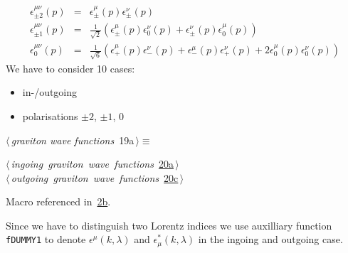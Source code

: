 \documentclass[a4paper,12pt]{amsart}
\renewcommand{\NWtarget}[2]{\hypertarget{#1}{#2}}
\renewcommand{\NWlink}[2]{\hyperlink{#1}{#2}}
\renewcommand{\NWtxtMacroRefIn}{Macro referenced in}
\renewcommand{\NWsep}{${\diamond}$}
\begin{document}
\begin{eqnarray}
\epsilon^{\mu\nu}_{\pm2}(p) &=& \epsilon_\pm^\mu(p)\epsilon_\pm^\nu(p)\\
\epsilon^{\mu\nu}_{\pm1}(p) &=& \frac1{\sqrt2}\left(
	\epsilon_\pm^\mu(p)\epsilon_0^\nu(p)
       +\epsilon_\pm^\nu(p)\epsilon_0^\mu(p)\right)\\
\epsilon^{\mu\nu}_0(p) &=&\frac1{\sqrt6}\left(
        \epsilon_+^\mu(p)\epsilon_-^\nu(p)
       +\epsilon_-^\mu(p)\epsilon_+^\nu(p)
       +2\epsilon_0^\mu(p)\epsilon_0^\nu(p)\right)
\end{eqnarray}
We have to consider 10 cases:
\begin{itemize}
\item in-/outgoing
\item polarisations $\pm2$, $\pm1$, $0$
\end{itemize}

\begin{flushleft} \small
\begin{minipage}{\linewidth}\label{scrap39}\raggedright\small
\NWtarget{nuweb19a}{} $\langle\,${\itshape graviton wave functions}\nobreak\ {\footnotesize {19a}}$\,\rangle\equiv$
\vspace{-1ex}
\begin{list}{}{} \item
\mbox{}\verb@@\hbox{$\langle\,${\itshape ingoing graviton wave functions}\nobreak\ {\footnotesize \NWlink{nuweb20a}{20a}}$\,\rangle$}\verb@@\\
\mbox{}\verb@@\hbox{$\langle\,${\itshape outgoing graviton wave functions}\nobreak\ {\footnotesize \NWlink{nuweb20c}{20c}}$\,\rangle$}\verb@@{\NWsep}
\end{list}
\vspace{-1.5ex}
\footnotesize
\begin{list}{}{\setlength{\itemsep}{-\parsep}\setlength{\itemindent}{-\leftmargin}}
\item \NWtxtMacroRefIn\ \NWlink{nuweb2b}{2b}.

\item{}
\end{list}
\end{minipage}\vspace{4ex}
\end{flushleft}
Since we have to distinguish two Lorentz indices we use
auxilliary function \texttt{fDUMMY1}
to denote $\epsilon^\mu(k,\lambda)$ and $\epsilon^\ast_\mu(k,\lambda)$
in the ingoing and outgoing case.
\end{document}

